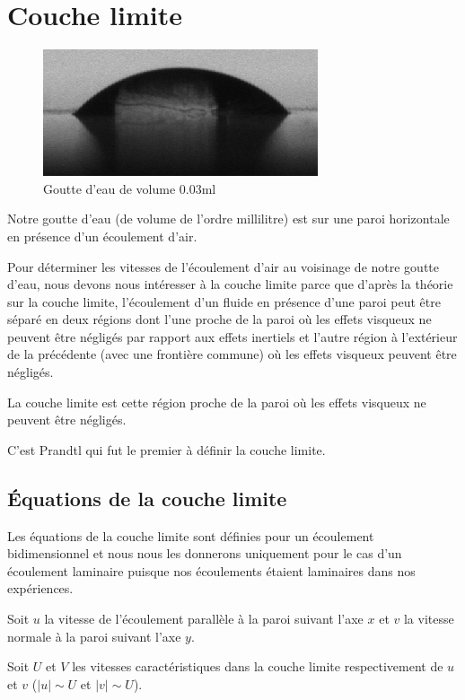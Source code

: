 \documentclass[french]{article}
\begin{document}
 
\section{Couche limite}

\begin{figure}[ht]
	\centering
	\includegraphics[scale = 0.6]{./image/crop_vitesse=28_volume=003.png}
	\caption{Goutte d'eau de volume $0.03$ml}
\end{figure}
Notre goutte d'eau (de volume de l'ordre millilitre) est sur une paroi horizontale en présence d'un écoulement d'air.


Pour déterminer les vitesses de l'écoulement d'air au voisinage de notre goutte d'eau, nous devons nous intéresser à la couche limite parce que d'après la théorie sur la couche limite, l'écoulement d'un fluide en présence d'une paroi peut être séparé en deux régions dont l'une proche de la paroi où les effets visqueux ne peuvent être négligés par rapport aux effets inertiels et l'autre région à l'extérieur de la précédente (avec une frontière commune) où les effets visqueux peuvent être négligés.

La couche limite est cette région proche de la paroi où les effets visqueux ne peuvent être négligés.

C'est Prandtl qui fut le premier à définir la couche limite. 

\subsection{Équations de la couche limite }

Les équations de la couche limite sont définies pour un écoulement bidimensionnel et nous nous les donnerons uniquement pour le cas d'un écoulement laminaire puisque nos écoulements étaient laminaires dans nos expériences.

Soit $u$ la vitesse de l'écoulement parallèle à la paroi suivant l'axe $x$ et $v$ la vitesse normale à la paroi suivant l'axe $y$.

Soit $U$ et $V$ les vitesses caractéristiques dans la couche limite respectivement de $u$ et $v$ ($\left| u \right| \sim U$ et $\left| v \right| \sim U$).
\end{document}
